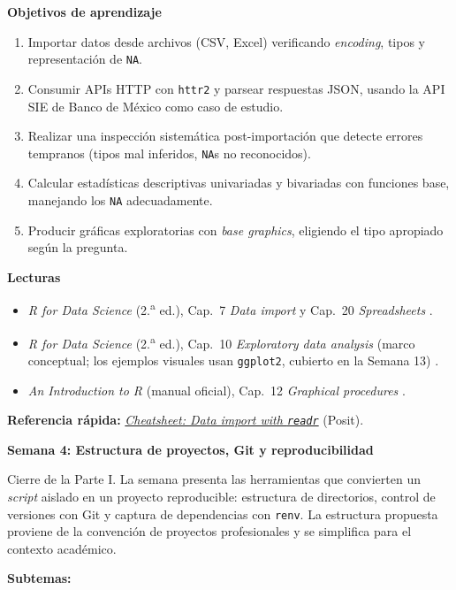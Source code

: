 \documentclass[11pt,letterpaper]{article}
\newcommand{\semana}[2]{%
  \bigskip%
  {\color{main}\Large\bfseries Semana #1: #2\par}%
  \smallskip%
}
\newcommand{\cheatsheet}[2]{%
  \href{https://rstudio.github.io/cheatsheets/#1.pdf}{\textit{Cheatsheet: #2}}%
}
\begin{document}
\medskip
\noindent\textbf{Objetivos de aprendizaje}
\begin{enumerate}[leftmargin=*, itemsep=1pt]
    \item Importar datos desde archivos (CSV, Excel) verificando \textit{encoding}, tipos y representación de \texttt{NA}.
    \item Consumir APIs HTTP con \texttt{httr2} y parsear respuestas JSON, usando la API SIE de Banco de México como caso de estudio.
    \item Realizar una inspección sistemática post-importación que detecte errores tempranos (tipos mal inferidos, \texttt{NA}s no reconocidos).
    \item Calcular estadísticas descriptivas univariadas y bivariadas con funciones base, manejando los \texttt{NA} adecuadamente.
    \item Producir gráficas exploratorias con \textit{base graphics}, eligiendo el tipo apropiado según la pregunta.
\end{enumerate}

\medskip
\noindent\textbf{Lecturas}
\begin{itemize}[leftmargin=*, itemsep=1pt]
    \item \textit{R for Data Science} (2.\textsuperscript{a} ed.), Cap.\ 7 \textit{Data import} y Cap.\ 20 \textit{Spreadsheets} \cite{wickham2023r4ds}.
    \item \textit{R for Data Science} (2.\textsuperscript{a} ed.), Cap.\ 10 \textit{Exploratory data analysis} (marco conceptual; los ejemplos visuales usan \texttt{ggplot2}, cubierto en la Semana 13) \cite{wickham2023r4ds}.
    \item \textit{An Introduction to R} (manual oficial), Cap.\ 12 \textit{Graphical procedures} \cite{rcoreteam-intro}.
\end{itemize}

\medskip
\noindent\textbf{Referencia rápida:} \cheatsheet{data-import}{Data import with \texttt{readr}} (Posit).

\semana{4}{Estructura de proyectos, Git y reproducibilidad}

Cierre de la Parte I. La semana presenta las herramientas que convierten un \textit{script} aislado en un proyecto reproducible: estructura de directorios, control de versiones con Git y captura de dependencias con \texttt{renv}. La estructura propuesta proviene de la convención de proyectos profesionales y se simplifica para el contexto académico.

\textbf{Subtemas:}
\end{document}
